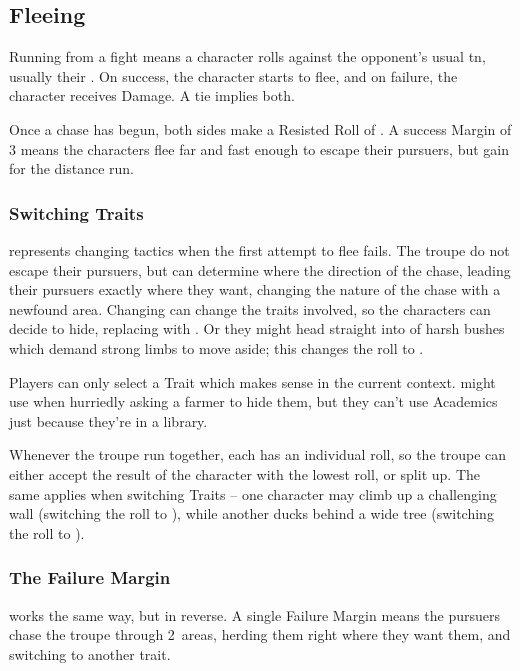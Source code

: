 \begin{multicols}{2}

\subsection{Fleeing}

Running from a fight means a character rolls  against the opponent's usual \gls{tn}, usually their .
On success, the character starts to flee, and on failure, the character receives Damage.
A tie implies both.

Once a chase has begun, both sides make a Resisted Roll of .
A success Margin of 3 means the characters flee far and fast enough to escape their pursuers, but gain  for the distance run.

\subsubsection{Switching Traits}
represents changing tactics when the first attempt to flee fails.
The troupe do not escape their pursuers, but can determine where the direction of the chase, leading their pursuers exactly where they want, changing the nature of the chase with a newfound \gls{area}.
Changing  can change the \glspl{trait} involved, so the characters can decide to hide, replacing  with .
Or they might head straight into  of harsh bushes which demand strong limbs to move aside; this changes the roll to .

Players can only select a Trait which makes sense in the current context.
 might use  when hurriedly asking a farmer to hide them, but they can't use Academics just because they're in a library.

Whenever the troupe run together, each has an individual roll, so the troupe can either accept the result of the character with the lowest roll, or split up.
The same applies when switching Traits -- one character may climb up a challenging wall (switching the roll to ), while another ducks behind a wide tree (switching the roll to ).

\subsubsection{The Failure Margin}
works the same way, but in reverse.
A single Failure Margin means the pursuers chase the troupe through 2~\glspl{area}, herding them right where they want them, and switching to another \gls{trait}.


\end{multicols}

